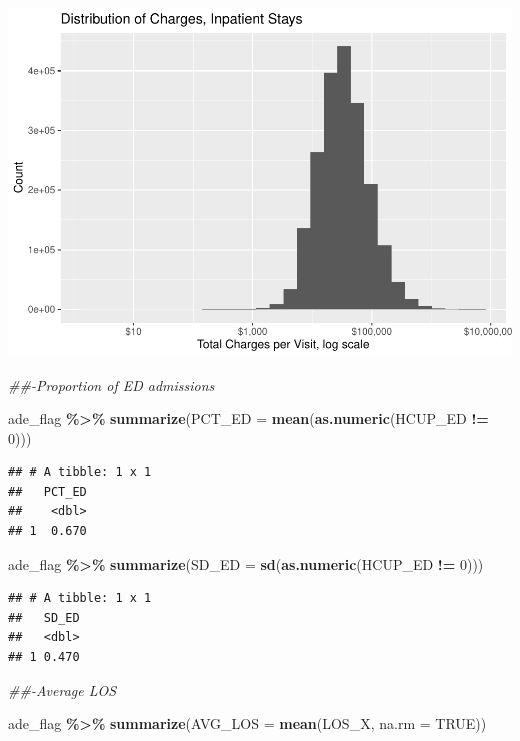 \documentclass[preprint, 3p,
authoryear]{elsarticle} %
\newenvironment{Shaded}{\begin{snugshade}}{\end{snugshade}}
\newcommand{\CommentTok}[1]{\textcolor[rgb]{0.56,0.35,0.01}{\textit{#1}}}
\newcommand{\DataTypeTok}[1]{\textcolor[rgb]{0.13,0.29,0.53}{#1}}
\newcommand{\DecValTok}[1]{\textcolor[rgb]{0.00,0.00,0.81}{#1}}
\newcommand{\KeywordTok}[1]{\textcolor[rgb]{0.13,0.29,0.53}{\textbf{#1}}}
\newcommand{\NormalTok}[1]{#1}
\newcommand{\OperatorTok}[1]{\textcolor[rgb]{0.81,0.36,0.00}{\textbf{#1}}}
\newcommand{\OtherTok}[1]{\textcolor[rgb]{0.56,0.35,0.01}{#1}}
\newcommand{\StringTok}[1]{\textcolor[rgb]{0.31,0.60,0.02}{#1}}
\begin{document}
\includegraphics{final-project-paper_files/figure-latex/av-charge-1.pdf}

\begin{Shaded}
\begin{Highlighting}[]
\CommentTok{\#\#{-}Proportion of ED admissions }

\NormalTok{ade\_flag }\OperatorTok{\%\textgreater{}\%}
\StringTok{  }\KeywordTok{summarize}\NormalTok{(}\DataTypeTok{PCT\_ED =} \KeywordTok{mean}\NormalTok{(}\KeywordTok{as.numeric}\NormalTok{(HCUP\_ED }\OperatorTok{!=}\StringTok{ }\DecValTok{0}\NormalTok{)))}
\end{Highlighting}
\end{Shaded}

\begin{verbatim}
## # A tibble: 1 x 1
##   PCT_ED
##    <dbl>
## 1  0.670
\end{verbatim}

\begin{Shaded}
\begin{Highlighting}[]
\NormalTok{ade\_flag }\OperatorTok{\%\textgreater{}\%}
\StringTok{    }\KeywordTok{summarize}\NormalTok{(}\DataTypeTok{SD\_ED =} \KeywordTok{sd}\NormalTok{(}\KeywordTok{as.numeric}\NormalTok{(HCUP\_ED }\OperatorTok{!=}\StringTok{ }\DecValTok{0}\NormalTok{)))}
\end{Highlighting}
\end{Shaded}

\begin{verbatim}
## # A tibble: 1 x 1
##   SD_ED
##   <dbl>
## 1 0.470
\end{verbatim}

\begin{Shaded}
\begin{Highlighting}[]
\CommentTok{\#\#{-}Average LOS }

\NormalTok{ade\_flag }\OperatorTok{\%\textgreater{}\%}
\StringTok{    }\KeywordTok{summarize}\NormalTok{(}\DataTypeTok{AVG\_LOS =} \KeywordTok{mean}\NormalTok{(LOS\_X, }\DataTypeTok{na.rm =} \OtherTok{TRUE}\NormalTok{))}
\end{Highlighting}
\end{Shaded}
\end{document}
